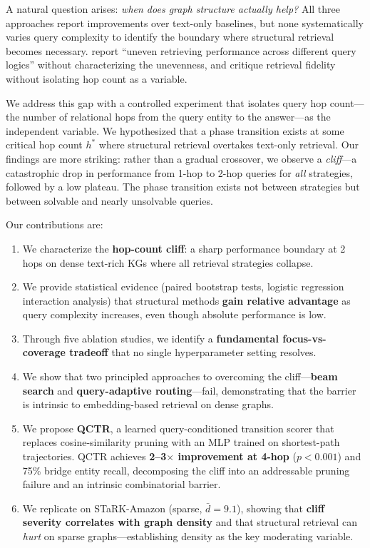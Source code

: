 \documentclass[11pt]{article}
\begin{document}
A natural question arises: \textit{when does graph structure actually help?} All three approaches report improvements over text-only baselines, but none systematically varies query complexity to identify the boundary where structural retrieval becomes necessary. \citet{yue2025mor} report ``uneven retrieving performance across different query logics'' without characterizing the unevenness, and \citet{yu2025graphflow} critique retrieval fidelity without isolating hop count as a variable.

We address this gap with a controlled experiment that isolates query hop count---the number of relational hops from the query entity to the answer---as the independent variable. We hypothesized that a phase transition exists at some critical hop count $h^*$ where structural retrieval overtakes text-only retrieval. Our findings are more striking: rather than a gradual crossover, we observe a \textit{cliff}---a catastrophic drop in performance from 1-hop to 2-hop queries for \textit{all} strategies, followed by a low plateau. The phase transition exists not between strategies but between solvable and nearly unsolvable queries.

Our contributions are:
\begin{enumerate}
    \item We characterize the \textbf{hop-count cliff}: a sharp performance boundary at 2 hops on dense text-rich KGs where all retrieval strategies collapse.
    \item We provide statistical evidence (paired bootstrap tests, logistic regression interaction analysis) that structural methods \textbf{gain relative advantage} as query complexity increases, even though absolute performance is low.
    \item Through five ablation studies, we identify a \textbf{fundamental focus-vs-coverage tradeoff} that no single hyperparameter setting resolves.
    \item We show that two principled approaches to overcoming the cliff---\textbf{beam search} and \textbf{query-adaptive routing}---fail, demonstrating that the barrier is intrinsic to embedding-based retrieval on dense graphs.
    \item We propose \textbf{QCTR}, a learned query-conditioned transition scorer that replaces cosine-similarity pruning with an MLP trained on shortest-path trajectories. QCTR achieves \textbf{2--3$\times$ improvement at 4-hop} ($p < 0.001$) and 75\% bridge entity recall, decomposing the cliff into an addressable pruning failure and an intrinsic combinatorial barrier.
    \item We replicate on STaRK-Amazon (sparse, $\bar{d} = 9.1$), showing that \textbf{cliff severity correlates with graph density} and that structural retrieval can \textit{hurt} on sparse graphs---establishing density as the key moderating variable.
\end{enumerate}
\end{document}
